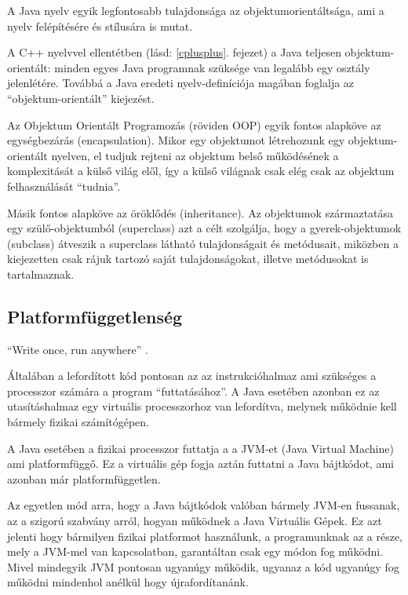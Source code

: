 \documentclass[a4paper,12pt]{report}
\begin{document}
A Java nyelv egyik legfontosabb tulajdonsága az objektumorientáltsága, ami a nyelv felépítésére és stílusára is mutat. 

\vspace{2mm}
A C++ nyelvvel ellentétben (lásd: \ref{cplusplus}. fejezet) a Java teljesen objektum-orientált: minden egyes Java programnak szüksége van legalább egy osztály jelenlétére. Továbbá a Java eredeti nyelv-definíciója magában foglalja az ``objektum-orientált'' kiejezést.

\vspace{2mm}
Az Objektum Orientált Programozás (röviden OOP) egyik fontos alapköve az egységbezárás (encapsulation). Mikor egy objektumot létrehozunk egy objektum-orientált nyelven, el tudjuk rejteni az objektum belső működésének a komplexitását a külső világ elől, így a külső világnak csak elég csak az objektum felhasználását ``tudnia''.

\vspace{2mm}
Másik fontos alapköve az öröklődés (inheritance). Az objektumok származtatása egy szülő-objektumból (superclass) azt a célt szolgálja, hogy a gyerek-objektumok (subclass) átveszik a superclass látható tulajdonságait és metódusait, miközben a kiejezetten csak rájuk tartozó saját tulajdonságokat, illetve metódusokat is tartalmaznak.

\subsection{Platformfüggetlenség}
\label{platformfugg}

``Write once, run anywhere'' \cite{wora}.

\vspace{2mm}
Általában a lefordított kód pontosan az az instrukcióhalmaz ami szükséges a processzor számára a program ``futtatásához''. A Java esetében azonban ez az utasításhalmaz egy virtuális processzorhoz van lefordítva, melynek működnie kell bármely fizikai számítógépen.

\vspace{2mm}
A Java esetében a fizikai processzor futtatja a a JVM-et (Java Virtual Machine) ami platformfüggő. Ez a virtuális gép fogja aztán futtatni a Java bájtkódot, ami azonban már platformfüggetlen. 

\vspace{2mm}
Az egyetlen mód arra, hogy a Java bájtkódok valóban bármely JVM-en fussanak, az a szigorú szabvány arról, hogyan működnek a Java Virtuális Gépek. Ez azt jelenti hogy bármilyen fizikai platformot használunk, a programunknak az a része, mely a JVM-mel van kapcsolatban, garantáltan csak egy módon fog működni. Mivel mindegyik JVM pontosan ugyanúgy működik, ugyanaz a kód ugyanúgy fog működni mindenhol anélkül hogy újrafordítanánk.
\end{document}
